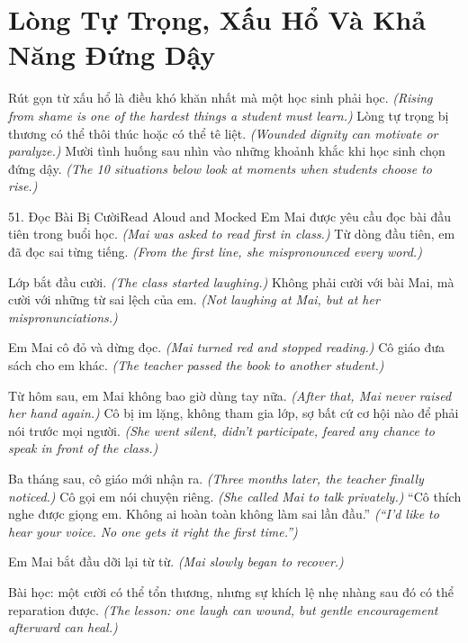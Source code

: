 \chapter{Lòng Tự Trọng, Xấu Hổ Và Khả Năng Đứng Dậy}

\begin{leadbox}
Rút gọn từ xấu hổ là điều khó khăn nhất mà một học sinh phải học.
\textit{(Rising from shame is one of the hardest things a student must learn.)}
Lòng tự trọng bị thương có thể thôi thúc hoặc có thể tê liệt.
\textit{(Wounded dignity can motivate or paralyze.)}
Mười tình huống sau nhìn vào những khoảnh khắc khi học sinh chọn đứng dậy.
\textit{(The 10 situations below look at moments when students choose to rise.)}
\end{leadbox}

\begin{truyen}{51. Đọc Bài Bị Cười}{Read Aloud and Mocked}
Em Mai được yêu cầu đọc bài đầu tiên trong buổi học.
\textit{(Mai was asked to read first in class.)}
Từ dòng đầu tiên, em đã đọc sai từng tiếng.
\textit{(From the first line, she mispronounced every word.)}

Lớp bắt đầu cười.
\textit{(The class started laughing.)}
Không phải cười với bài Mai, mà cười với những từ sai lệch của em.
\textit{(Not laughing at Mai, but at her mispronunciations.)}

Em Mai cô đỏ và dừng đọc.
\textit{(Mai turned red and stopped reading.)}
Cô giáo đưa sách cho em khác.
\textit{(The teacher passed the book to another student.)}

Từ hôm sau, em Mai không bao giờ dùng tay nữa.
\textit{(After that, Mai never raised her hand again.)}
Cô bị im lặng, không tham gia lớp, sợ bất cứ cơ hội nào để phải nói trước mọi người.
\textit{(She went silent, didn't participate, feared any chance to speak in front of the class.)}

Ba tháng sau, cô giáo mới nhận ra.
\textit{(Three months later, the teacher finally noticed.)}
Cô gọi em nói chuyện riêng.
\textit{(She called Mai to talk privately.)}
``Cô thích nghe được giọng em. Không ai hoàn toàn không làm sai lần đầu.''
\textit{(``I'd like to hear your voice. No one gets it right the first time.'')}

Em Mai bắt đầu dỡi lại từ từ.
\textit{(Mai slowly began to recover.)}

Bài học: một cười có thể tổn thương, nhưng sự khích lệ nhẹ nhàng sau đó có thể reparation được.
\textit{(The lesson: one laugh can wound, but gentle encouragement afterward can heal.)}
\end{truyen}

